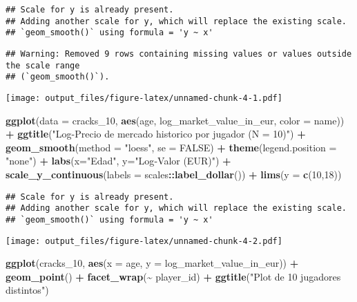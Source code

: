 \documentclass[
]{article}
\newenvironment{Shaded}{\begin{snugshade}}{\end{snugshade}}
\newcommand{\AttributeTok}[1]{\textcolor[rgb]{0.13,0.29,0.53}{#1}}
\newcommand{\ConstantTok}[1]{\textcolor[rgb]{0.56,0.35,0.01}{#1}}
\newcommand{\DecValTok}[1]{\textcolor[rgb]{0.00,0.00,0.81}{#1}}
\newcommand{\FunctionTok}[1]{\textcolor[rgb]{0.13,0.29,0.53}{\textbf{#1}}}
\newcommand{\NormalTok}[1]{#1}
\newcommand{\SpecialCharTok}[1]{\textcolor[rgb]{0.81,0.36,0.00}{\textbf{#1}}}
\newcommand{\StringTok}[1]{\textcolor[rgb]{0.31,0.60,0.02}{#1}}
\begin{document}
\begin{verbatim}
## Scale for y is already present.
## Adding another scale for y, which will replace the existing scale.
## `geom_smooth()` using formula = 'y ~ x'
\end{verbatim}

\begin{verbatim}
## Warning: Removed 9 rows containing missing values or values outside the scale range
## (`geom_smooth()`).
\end{verbatim}

\texttt{[image: output\_files/figure-latex/unnamed-chunk-4-1.pdf]}

\begin{Shaded}
\begin{Highlighting}[]
\FunctionTok{ggplot}\NormalTok{(}\AttributeTok{data =}\NormalTok{ cracks\_10, }\FunctionTok{aes}\NormalTok{(age, log\_market\_value\_in\_eur, }\AttributeTok{color =}\NormalTok{ name)) }\SpecialCharTok{+}
  \FunctionTok{ggtitle}\NormalTok{(}\StringTok{"Log{-}Precio de mercado historico por jugador (N = 10)"}\NormalTok{) }\SpecialCharTok{+}
  \FunctionTok{geom\_smooth}\NormalTok{(}\AttributeTok{method =} \StringTok{"loess"}\NormalTok{, }\AttributeTok{se =} \ConstantTok{FALSE}\NormalTok{) }\SpecialCharTok{+}
  \FunctionTok{theme}\NormalTok{(}\AttributeTok{legend.position =} \StringTok{"none"}\NormalTok{) }\SpecialCharTok{+}
  \FunctionTok{labs}\NormalTok{(}\AttributeTok{x=}\StringTok{"Edad"}\NormalTok{, }\AttributeTok{y=}\StringTok{"Log{-}Valor (EUR)"}\NormalTok{) }\SpecialCharTok{+}
  \FunctionTok{scale\_y\_continuous}\NormalTok{(}\AttributeTok{labels =}\NormalTok{ scales}\SpecialCharTok{::}\FunctionTok{label\_dollar}\NormalTok{()) }\SpecialCharTok{+}
  \FunctionTok{lims}\NormalTok{(}\AttributeTok{y =} \FunctionTok{c}\NormalTok{(}\DecValTok{10}\NormalTok{,}\DecValTok{18}\NormalTok{))}
\end{Highlighting}
\end{Shaded}

\begin{verbatim}
## Scale for y is already present.
## Adding another scale for y, which will replace the existing scale.
## `geom_smooth()` using formula = 'y ~ x'
\end{verbatim}

\texttt{[image: output\_files/figure-latex/unnamed-chunk-4-2.pdf]}

\begin{Shaded}
\begin{Highlighting}[]
\FunctionTok{ggplot}\NormalTok{(cracks\_10, }\FunctionTok{aes}\NormalTok{(}\AttributeTok{x =}\NormalTok{ age, }\AttributeTok{y =}\NormalTok{ log\_market\_value\_in\_eur)) }\SpecialCharTok{+}
  \FunctionTok{geom\_point}\NormalTok{() }\SpecialCharTok{+}
  \FunctionTok{facet\_wrap}\NormalTok{(}\SpecialCharTok{\textasciitilde{}}\NormalTok{ player\_id) }\SpecialCharTok{+}
  \FunctionTok{ggtitle}\NormalTok{(}\StringTok{"Plot de 10 jugadores distintos"}\NormalTok{)}
\end{Highlighting}
\end{Shaded}
\end{document}
